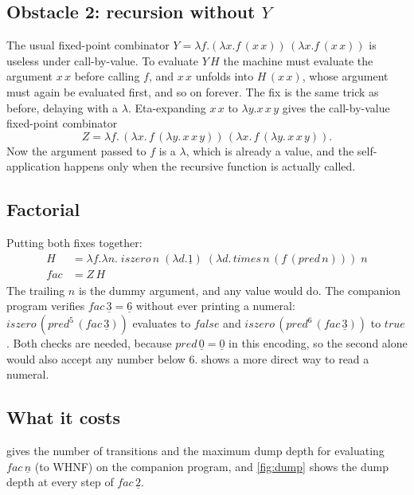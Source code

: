 \documentclass[11pt,a4paper]{article}
\theoremstyle{definition}
\theoremstyle{plain}
\begin{document}
\subsection{Obstacle 2: recursion without \texorpdfstring{$Y$}{Y}}

The usual fixed-point combinator
$Y = \lambda f.(\lambda x.f\,(x\,x))\,(\lambda x.f\,(x\,x))$ is useless under
call-by-value. To evaluate $Y\,H$ the machine must evaluate the argument
$x\,x$ before calling $f$, and $x\,x$ unfolds into $H\,(x\,x)$, whose argument
must again be evaluated first, and so on forever. The fix is the same trick
as before, delaying with a $\lambda$. Eta-expanding $x\,x$ to $\lambda y.x\,x\,y$
gives the call-by-value fixed-point combinator
\[
  Z = \lambda f.\,(\lambda x.\,f\,(\lambda y.\,x\,x\,y))\,(\lambda x.\,f\,(\lambda y.\,x\,x\,y)).
\]
Now the argument passed to $f$ is a $\lambda$, which is already a value, and the
self-application happens only when the recursive function is actually called.

\subsection{Factorial}

Putting both fixes together:
\begin{align*}
  H &= \lambda f.\lambda n.\;\mathit{iszero}\,n\;(\lambda d.\underline{1})\;
      (\lambda d.\,\mathit{times}\,n\,(f\,(\mathit{pred}\,n)))\;n\\
  \mathit{fac} &= Z\,H
\end{align*}
The trailing $n$ is the dummy argument, and any value would do. The companion
program verifies $\mathit{fac}\,\underline{3} = \underline{6}$ without ever
printing a numeral: $\mathit{iszero}\,(\mathit{pred}^5\,(\mathit{fac}\,\underline{3}))$
evaluates to $\mathit{false}$ and
$\mathit{iszero}\,(\mathit{pred}^6\,(\mathit{fac}\,\underline{3}))$ to $\mathit{true}$.
Both checks are needed, because $\mathit{pred}\,\underline{0} = \underline{0}$ in
this encoding, so the second alone would also accept any number below 6.
 shows a more direct way to read a numeral.

\subsection{What it costs}

 gives the number of transitions and the maximum dump depth for
evaluating $\mathit{fac}\,\underline{n}$ (to WHNF) on the companion program,
and \cref{fig:dump} shows the dump depth at every step of
$\mathit{fac}\,\underline{2}$.
\end{document}
